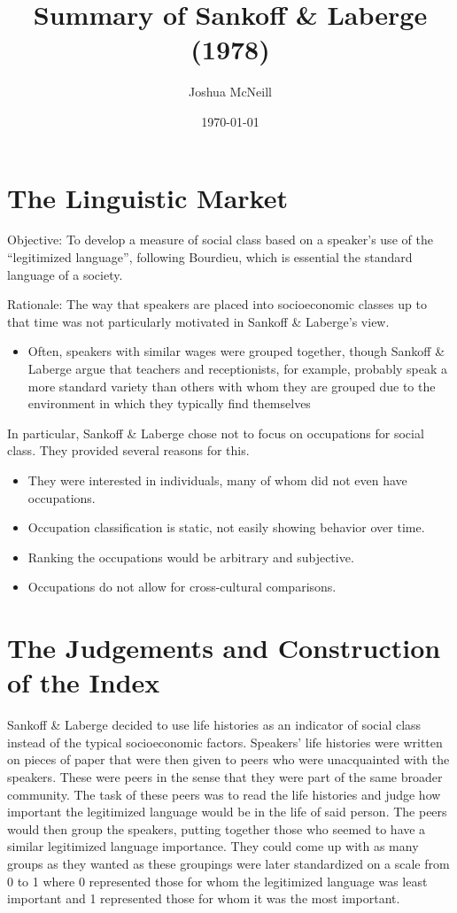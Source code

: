 \documentclass{article}
\title{Summary of Sankoff \& Laberge (1978)}
\author{Joshua McNeill}
\date{\today}
\begin{document}
  \maketitle
  \section{The Linguistic Market}
    Objective: To develop a measure of social class based on a speaker's use of the ``legitimized language'', following Bourdieu, which is essential the standard language of a society.

    {\noindent
    Rationale: The way that speakers are placed into socioeconomic classes up to that time was not particularly motivated in Sankoff \& Laberge's view.
    }
    \begin{itemize}
      \item Often, speakers with similar wages were grouped together, though Sankoff \& Laberge argue that teachers and receptionists, for example, probably speak a more standard variety than others with whom they are grouped due to the environment in which they typically find themselves
    \end{itemize}

    In particular, Sankoff \& Laberge chose not to focus on occupations for social class.
    They provided several reasons for this.
    \begin{itemize}
      \item They were interested in individuals, many of whom did not even have occupations.
      \item Occupation classification is static, not easily showing behavior over time.
      \item Ranking the occupations would be arbitrary and subjective.
      \item Occupations do not allow for cross-cultural comparisons.
    \end{itemize}

  \section{The Judgements and Construction of the Index}
    Sankoff \& Laberge decided to use life histories as an indicator of social class instead of the typical socioeconomic factors.
    Speakers' life histories were written on pieces of paper that were then given to peers who were unacquainted with the speakers.
    These were peers in the sense that they were part of the same broader community.
    The task of these peers was to read the life histories and judge how important the legitimized language would be in the life of said person.
    The peers would then group the speakers, putting together those who seemed to have a similar legitimized language importance.
    They could come up with as many groups as they wanted as these groupings were later standardized on a scale from 0 to 1 where 0 represented those for whom the legitimized language was least important and 1 represented those for whom it was the most important.
\end{document}
